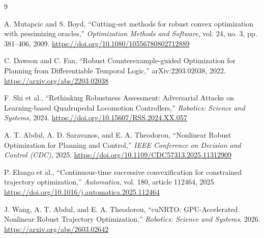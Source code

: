 \documentclass{article}
\begin{document}
\begin{thebibliography}{9}

A. Mutapcic and S. Boyd,
``Cutting-set methods for robust convex optimization
with pessimizing oracles,''
\textit{Optimization Methods and Software},
vol. 24, no. 3, pp. 381--406, 2009.
\url{https://doi.org/10.1080/10556780802712889}

C. Dawson and C. Fan,
``Robust Counterexample-guided Optimization
for Planning from Differentiable Temporal Logic,''
arXiv:2203.02038, 2022.
\url{https://arxiv.org/abs/2203.02038}

F. Shi et al.,
``Rethinking Robustness Assessment:
Adversarial Attacks on Learning-based
Quadrupedal Locomotion Controllers,''
\textit{Robotics: Science and Systems}, 2024.
\url{https://doi.org/10.15607/RSS.2024.XX.057}

A. T. Abdul, A. D. Saravanos,
and E. A. Theodorou,
``Nonlinear Robust Optimization for
Planning and Control,''
\textit{IEEE Conference on Decision
and Control (CDC)}, 2025.
\url{https://doi.org/10.1109/CDC57313.2025.11312909}

P. Elango et al.,
``Continuous-time successive convexification
for constrained trajectory optimization,''
\textit{Automatica},
vol. 180, article 112464, 2025.
\url{https://doi.org/10.1016/j.automatica.2025.112464}

J. Wang, A. T. Abdul, and E. A. Theodorou,
``cuNRTO: GPU-Accelerated Nonlinear Robust
Trajectory Optimization,''
\textit{Robotics: Science and Systems}, 2026.
\url{https://arxiv.org/abs/2603.02642}

\end{thebibliography}
\end{document}
